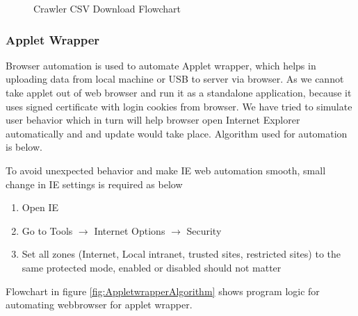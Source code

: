 \documentclass[article,type=msc,colorback,accentcolor=tud9c,twoside,11pt]{tudthesis}
\begin{document}
\begin{center}
\begin{figure}[h!]
  \caption{Crawler CSV Download Flowchart}
  \label{fig:CrawlerCSVAlgorithm}
\end{figure}
\end{center}
\subsubsection{Applet Wrapper}
Browser automation is used to automate Applet wrapper, which helps in uploading data from local machine or USB to server via browser. As we cannot take applet out of web browser and run it as a standalone application, because it uses signed certificate with login cookies from browser. We have tried to simulate user behavior which in turn will help browser open Internet Explorer automatically and and update would take place. Algorithm used for automation is below.

To avoid unexpected behavior and make IE web automation smooth, small change in IE settings is required as below
\begin{enumerate}
\item Open IE
\item Go to Tools $\rightarrow$ {Internet Options} $\rightarrow$ {Security}
\item Set all zones (Internet, Local intranet, trusted sites, restricted sites) to the same protected mode, enabled or disabled should not matter
\end{enumerate}
Flowchart in figure \ref{fig:AppletwrapperAlgorithm} shows  program logic for automating webbrowser for applet wrapper.
\end{document}
